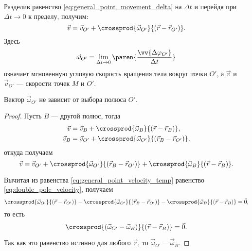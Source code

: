 Разделив равенство \ref{eq:general_point_movement_delta} на $\Delta t$ и перейдя
при $\Delta t \to 0$ к пределу, получим:
\begin{equation}
  \label{eq:general_point_velocity_temp}
  \vec{v} = \vec{v}_{O'} +
    \crossprod
      {\vec{\omega}_{O'}}
      {(\vec{r} - \vec{r}_{O'})}.
\end{equation}
Здесь
\begin{equation*}
  \vec{\omega}_{O'} = \lim_{\Delta t \to 0}
    \paren{
      \frac{\vv{\Delta \varphi_{O'}}}{\Delta t}
    }
\end{equation*}
означает мгновенную угловую скорость вращения тела вокруг точки $O'$, а
$\vec{v}$ и $\vec{v}_{O'}$ --- скорости точек $M$ и $O'$.

\begin{theorem}
  \label{theorem:general_velocity_pole_independence}
  Вектор $\vec{\omega}_{O'}$ не зависит от выбора полюса $O'$.
\end{theorem}

\begin{proof}
  Пусть $B$ --- другой полюс, тогда
  \begin{equation*}
    \begin{aligned}
      \vec{v} &= \vec{v}_B +
        \crossprod{\vec{\omega}_B}{(\vec{r} - \vec{r}_B)}, \\
      \vec{v}_B &= \vec{v}_{O'} +
        \crossprod{\vec{\omega}_{O'}}{(\vec{r}_B - \vec{r}_{O'})},
    \end{aligned}
  \end{equation*}
  откуда получаем
  \begin{equation}
    \label{eq:double_pole_velocity}
    \vec{v} = \vec{v}_{O'}
        + \crossprod{\vec{\omega}_{O'}}{(\vec{r}_B - \vec{r}_{O'})}
        + \crossprod{\vec{\omega}_B}{(\vec{r} - \vec{r}_B)}.
  \end{equation}

  Вычитая из равенства \ref{eq:general_point_velocity_temp} равенство
  \ref{eq:double_pole_velocity}, получаем
  \begin{equation*}
    \crossprod{\vec{\omega}_{O'}}{(\vec{r} - \vec{r}_{O'})}
      - \crossprod{\vec{\omega}_{O'}}{(\vec{r}_B - \vec{r}_{O'})}
      - \crossprod{\vec{\omega}_B}{(\vec{r} - \vec{r}_B)} = \vec{0},
  \end{equation*}
  то есть
  \begin{equation*}
    \crossprod
      {(\vec{\omega}_{O'} - \vec{\omega}_B)}
      {(\vec{r} - \vec{r}_B)} = \vec{0}.
  \end{equation*}

  Так как это равенство истинно для любого $\vec{r}$, то $\vec{\omega}_{O'} =
  \vec{\omega}_B$.
\end{proof}


